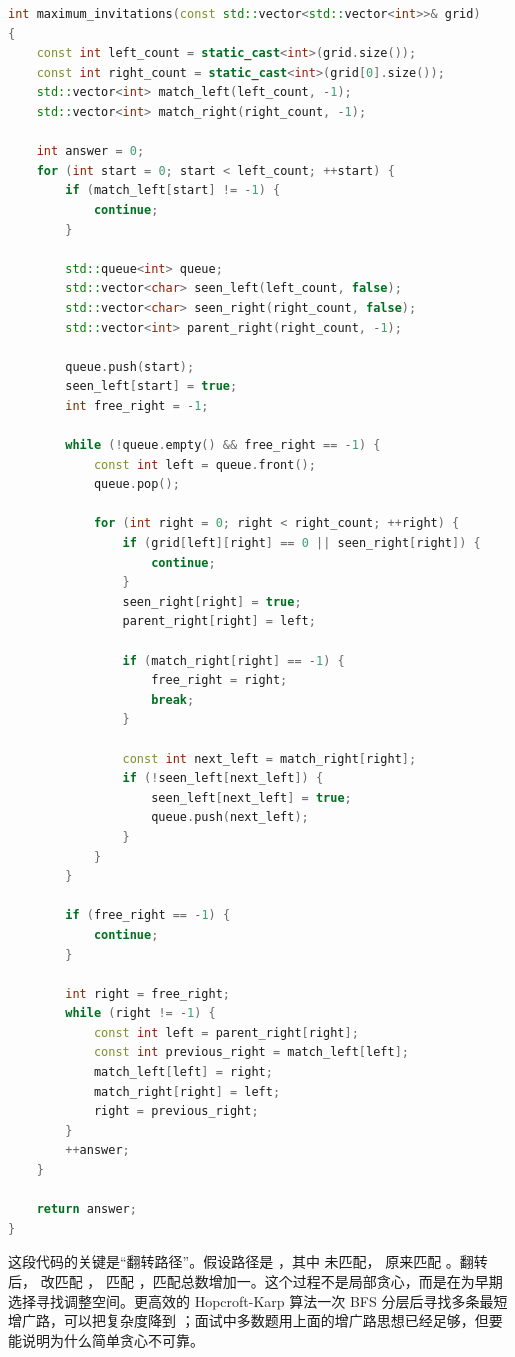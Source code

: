 \begin{lstlisting}[language=C++,caption={LeetCode 1820 邀请的最大数量：BFS 增广路二分图匹配}]
int maximum_invitations(const std::vector<std::vector<int>>& grid)
{
    const int left_count = static_cast<int>(grid.size());
    const int right_count = static_cast<int>(grid[0].size());
    std::vector<int> match_left(left_count, -1);
    std::vector<int> match_right(right_count, -1);

    int answer = 0;
    for (int start = 0; start < left_count; ++start) {
        if (match_left[start] != -1) {
            continue;
        }

        std::queue<int> queue;
        std::vector<char> seen_left(left_count, false);
        std::vector<char> seen_right(right_count, false);
        std::vector<int> parent_right(right_count, -1);

        queue.push(start);
        seen_left[start] = true;
        int free_right = -1;

        while (!queue.empty() && free_right == -1) {
            const int left = queue.front();
            queue.pop();

            for (int right = 0; right < right_count; ++right) {
                if (grid[left][right] == 0 || seen_right[right]) {
                    continue;
                }
                seen_right[right] = true;
                parent_right[right] = left;

                if (match_right[right] == -1) {
                    free_right = right;
                    break;
                }

                const int next_left = match_right[right];
                if (!seen_left[next_left]) {
                    seen_left[next_left] = true;
                    queue.push(next_left);
                }
            }
        }

        if (free_right == -1) {
            continue;
        }

        int right = free_right;
        while (right != -1) {
            const int left = parent_right[right];
            const int previous_right = match_left[left];
            match_left[left] = right;
            match_right[right] = left;
            right = previous_right;
        }
        ++answer;
    }

    return answer;
}
\end{lstlisting}

这段代码的关键是“翻转路径”。假设路径是 ，其中  未匹配， 原来匹配 。翻转后， 改匹配 ， 匹配 ，匹配总数增加一。这个过程不是局部贪心，而是在为早期选择寻找调整空间。更高效的 Hopcroft-Karp 算法一次 BFS 分层后寻找多条最短增广路，可以把复杂度降到 ；面试中多数题用上面的增广路思想已经足够，但要能说明为什么简单贪心不可靠。

